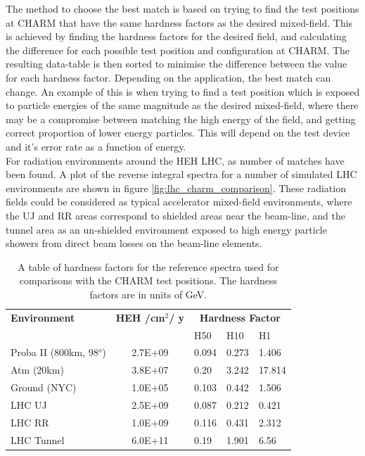 The method to choose the best match is based on trying to find the test positions at CHARM that have the same hardness factors as the desired mixed-field. This is achieved by finding the hardness factors for the desired field, and calculating the difference for each possible test position and configuration at CHARM. The resulting data-table is then sorted to minimise the difference between the value for each hardness factor. Depending on the application, the best match can change. An example of this is when trying to find a test position which is exposed to particle energies of the same magnitude as the desired mixed-field, where there may be a compromise between matching the high energy of the field, and getting correct proportion of lower energy particles. This will depend on the test device and it's error rate as a function of energy. \\

For radiation environments around the HEH LHC, as number of matches have been found. A plot of the reverse integral spectra for a number of simulated LHC environments are shown in figure \ref{fig:lhc_charm_comparison}. These radiation fields could be considered as typical accelerator mixed-field environments, where the UJ and RR areas correspond to shielded areas near the beam-line, and the tunnel area as an un-shielded environment exposed to high energy particle showers from direct beam losses on the beam-line elements. \\


\begin{table}[htbp]
\centering
\begin{tabular}{l|c|l|l|l}
\textbf{Environment} & \textbf{HEH /cm$^{2}$/ y} & \multicolumn{3}{c}{\textbf{Hardness Factor}} \\ \cline{3-5}
				& & H50   & H10   & H1 \\
\hline
\hline
Proba II (800km, 98$^{o}$)		& 2.7E+09 & 0.094 & 0.273 & 1.406 \\
Atm (20km)						& 3.8E+07 & 0.20  & 3.242 & 17.814 \\
Ground (NYC)					& 1.0E+05 & 0.103 & 0.442 & 1.506 \\
LHC UJ							& 2.5E+09 & 0.087 & 0.212 & 0.421 \\
LHC RR							& 1.0E+09 & 0.116 & 0.431 & 2.312 \\
LHC Tunnel						& 6.0E+11 & 0.19  & 1.901 & 6.56 \\
\end{tabular}%
\caption{A table of hardness factors for the reference spectra used for comparisons with the CHARM test positions. The hardness factors are in units of GeV.}
\label{tab:hardness_factor_references}%
\end{table}%

